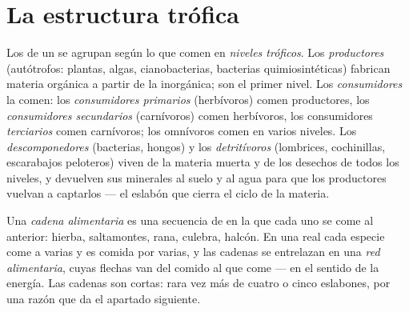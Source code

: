 \section{La estructura trófica}

\begin{definition}\label{def:b1:ecosystem-organization:trophic}
Los  de un  se agrupan según lo que comen en
\emph{niveles tróficos}. Los \emph{productores} (autótrofos: plantas, algas,
cianobacterias, bacterias quimiosintéticas) fabrican materia orgánica a
partir de la inorgánica; son el primer nivel. Los \emph{consumidores} la
comen: los \emph{consumidores primarios} (herbívoros) comen productores, los
\emph{consumidores secundarios} (carnívoros) comen herbívoros, los
consumidores \emph{terciarios} comen carnívoros; los omnívoros comen en
varios niveles. Los \emph{descomponedores} (bacterias, hongos) y los
\emph{detritívoros} (lombrices, cochinillas, escarabajos peloteros) viven de
la materia muerta y de los desechos de todos los niveles, y devuelven sus
minerales al suelo y al agua para que los productores vuelvan a captarlos
--- el eslabón que cierra el ciclo de la materia.
\end{definition}

\begin{definition}\label{def:b1:ecosystem-organization:foodweb}
Una \emph{cadena alimentaria} es una secuencia de  en la que cada
uno se come al anterior: hierba, saltamontes, rana, culebra, halcón. En una
 real cada especie come a varias y es comida por varias, y las
cadenas se entrelazan en una \emph{red alimentaria}, cuyas flechas van del
comido al que come --- en el sentido de la energía. Las cadenas son cortas:
rara vez más de cuatro o cinco eslabones, por una razón que da el apartado
siguiente.
\end{definition}


